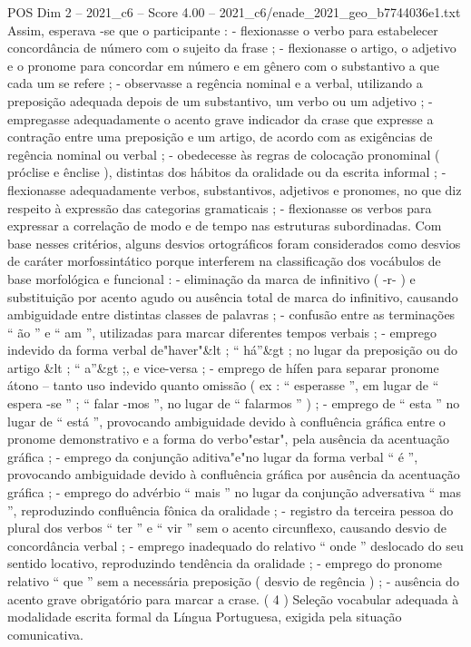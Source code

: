 \begin{textsample}{POS Dim 2 – 2021\_c6 – Score 4.00 – 2021\_c6/enade\_2021\_geo\_b7744036e1.txt}
Assim, esperava -se que o participante : - flexionasse o verbo para estabelecer concordância de número com o sujeito da frase ; - flexionasse o artigo, o adjetivo e o pronome para concordar em número e em gênero com o substantivo a que cada um se refere ; - observasse a regência nominal e a verbal, utilizando a preposição adequada depois de um substantivo, um verbo ou um adjetivo ; - empregasse adequadamente o acento grave indicador da crase que expresse a contração entre uma preposição e um artigo, de acordo com as exigências de regência nominal ou verbal ; - obedecesse às regras de colocação pronominal ( próclise e ênclise ), distintas dos hábitos da oralidade ou da escrita informal ; - flexionasse adequadamente verbos, substantivos, adjetivos e pronomes, no que diz respeito à expressão das categorias gramaticais ; - flexionasse os verbos para expressar a correlação de modo e de tempo nas estruturas subordinadas.
Com base nesses critérios, alguns desvios ortográficos foram considerados como desvios de caráter morfossintático porque interferem na classificação dos vocábulos de base morfológica e funcional : - eliminação da marca de infinitivo ( -r- ) e substituição por acento agudo ou ausência total de marca do infinitivo, causando ambiguidade entre distintas classes de palavras ; - confusão entre as terminações “ ão ” e “ am ”, utilizadas para marcar diferentes tempos verbais ; - emprego indevido da forma verbal de"haver"\&lt ; “ há”\&gt ; no lugar da preposição ou do artigo \&lt ; “ a”\&gt ;, e vice-versa ; - emprego de hífen para separar pronome átono – tanto uso indevido quanto omissão ( ex : “ esperasse ”, em lugar de “ espera -se ” ; “ falar -mos ”, no lugar de “ falarmos ” ) ; - emprego de “ esta ” no lugar de “ está ”, provocando ambiguidade devido à confluência gráfica entre o pronome demonstrativo e a forma do verbo"estar", pela ausência da acentuação gráfica ; - emprego da conjunção aditiva"e"no lugar da forma verbal “ é ”, provocando ambiguidade devido à confluência gráfica por ausência da acentuação gráfica ; - emprego do advérbio “ mais ” no lugar da conjunção adversativa “ mas ”, reproduzindo confluência fônica da oralidade ; - registro da terceira pessoa do plural dos verbos “ ter ” e “ vir ” sem o acento circunflexo, causando desvio de concordância verbal ; - emprego inadequado do relativo “ onde ” deslocado do seu sentido locativo, reproduzindo tendência da oralidade ; - emprego do pronome relativo “ que ” sem a necessária preposição ( desvio de regência ) ; - ausência do acento grave obrigatório para marcar a crase. ( 4 ) Seleção vocabular adequada à modalidade escrita formal da Língua Portuguesa, exigida pela situação comunicativa.

\end{textsample}
